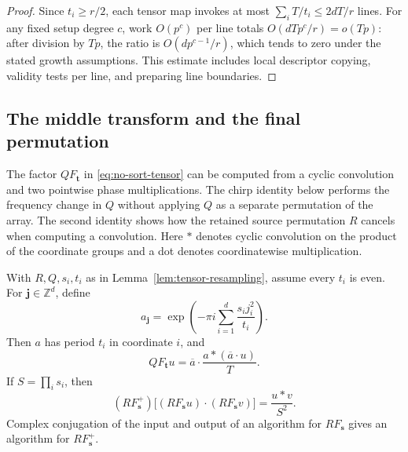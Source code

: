 \begin{proof}
Since $t_i\geq r/2$, each tensor map invokes at most
$\sum_iT/t_i\leq2dT/r$ lines. For any fixed setup degree $c$, work
$O(p^c)$ per line totals $O(dTp^c/r)=o(Tp)$: after division by $Tp$,
the ratio is $O(dp^{c-1}/r)$, which tends to zero under the stated growth
assumptions. This estimate includes local descriptor copying, validity
tests per line, and preparing line boundaries.
\end{proof}

\subsection{The middle transform and the final permutation}

The factor $QF_{\boldsymbol t}$ in \eqref{eq:no-sort-tensor} can be
computed from a cyclic convolution and two pointwise phase
multiplications. The chirp identity below performs the frequency change
in $Q$ without applying $Q$ as a separate permutation of the array.
The second identity shows how the
retained source permutation $R$ cancels when computing a convolution.
Here $*$ denotes
cyclic convolution on the product of the coordinate groups and a dot
denotes coordinatewise multiplication.

\begin{lemma}
\label{lem:chirp-permutation}
With $R,Q,s_i,t_i$ as in Lemma~\ref{lem:tensor-resampling},
assume every $t_i$ is even. For $\boldsymbol j\in\mathbb Z^d$, define
\[
 a_{\boldsymbol j}
 =\exp\left(-\pi i\sum_{i=1}^d\frac{s_i j_i^2}{t_i}\right).
\]
Then $a$ has period $t_i$ in coordinate $i$, and
\begin{equation}
 QF_{\boldsymbol t}u
 =\overline a\mathbin{\cdot}
       \frac{a*(\overline a\mathbin{\cdot}u)}{T}.
 \label{eq:permuted-chirp}
\end{equation}
If $S=\prod_i s_i$, then
\begin{equation}
 (RF_{\boldsymbol s}^+)
   \bigl[(RF_{\boldsymbol s}u)\mathbin{\cdot}
         (RF_{\boldsymbol s}v)\bigr]
 =\frac{u*v}{S^2}.
 \label{eq:source-permutation-cancel}
\end{equation}
Complex conjugation of the input and output of an algorithm for
$RF_{\boldsymbol s}$ gives an algorithm for $RF_{\boldsymbol s}^+$.
\end{lemma}

